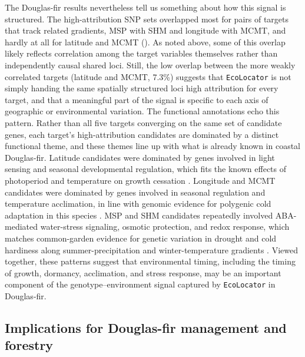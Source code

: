\documentclass[]{article}
\newcommand{\dfir}{Douglas-fir\xspace}
\newcommand{\ecolocator}{\texttt{EcoLocator}\xspace}
\begin{document}
The \dfir results nevertheless tell us something
about how this signal is structured.
The high-attribution SNP sets overlapped most for pairs of targets
that track related gradients, MSP with SHM and longitude with MCMT,
and hardly at all for latitude and MCMT ().
As noted above, some of this overlap likely reflects correlation among
the target variables themselves rather than independently causal shared
loci. Still, the low overlap between the more weakly correlated targets
(latitude and MCMT, 7.3\%) suggests that \ecolocator is not simply
handing the same spatially structured loci high attribution for every
target, and that a meaningful part of the signal is specific to each
axis of geographic or environmental variation.
The functional annotations echo this pattern. Rather than all five targets
converging on the same set of candidate genes, each target's high-attribution
candidates are dominated by a distinct functional theme, and these themes
line up with what is already known in coastal \dfir. Latitude candidates
were dominated by genes involved in light sensing and seasonal
developmental regulation, which fits the known effects of photoperiod
and temperature on growth cessation \citep{ford_photoperiod_2017}. Longitude
and MCMT candidates were dominated by genes involved in seasonal regulation
and temperature acclimation, in line with genomic evidence for polygenic
cold adaptation in this species \citep{delatorre_polygenic_2021}.
MSP and SHM candidates repeatedly involved ABA-mediated water-stress signaling,
osmotic protection, and redox response, which matches common-garden evidence
for genetic variation in drought and cold hardiness along
summer-precipitation and winter-temperature gradients
\citep{bansal_tolerance_2016}. Viewed together,
these patterns suggest that environmental timing, including the timing of growth, 
dormancy, acclimation, and stress response, may be an important component of the 
genotype--environment signal captured by \ecolocator in \dfir.

\subsection{Implications for \dfir management and forestry}
\end{document}
